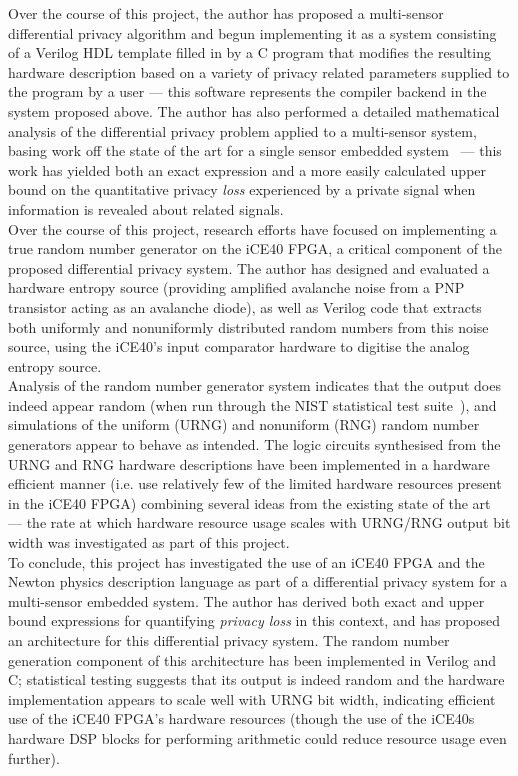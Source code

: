 \documentclass[12pt]{article}
\begin{document}
Over the course of this project, the author has proposed a multi-sensor differential privacy algorithm and begun implementing it as a system consisting of a Verilog HDL template filled in by a C program that modifies the resulting hardware description based on a variety of privacy related parameters supplied to the program by a user --- this software represents the compiler backend in the system proposed above. The author has also performed a detailed mathematical analysis of the differential privacy problem applied to a multi-sensor system, basing work off the state of the art for a single sensor embedded system~\cite{Choi2018GuaranteeingLD} --- this work has yielded both an exact expression and a more easily calculated upper bound on the quantitative privacy \textit{loss} experienced by a private signal when information is revealed about related signals.\\

Over the course of this project, research efforts have focused on implementing a true random number generator on the iCE40 FPGA, a critical component of the proposed differential privacy system. The author has designed and evaluated a hardware entropy source (providing amplified avalanche noise from a PNP transistor acting as an avalanche diode), as well as Verilog code that extracts both uniformly and nonuniformly distributed random numbers from this noise source, using the iCE40's input comparator hardware to digitise the analog entropy source.\\

Analysis of the random number generator system indicates that the output does indeed appear random (when run through the NIST statistical test suite\cite{nist_test_suite}~\cite{arcetri_sts}), and simulations of the uniform (URNG) and nonuniform (RNG) random number generators appear to behave as intended. The logic circuits synthesised from the URNG and RNG hardware descriptions have been implemented in a hardware efficient manner (i.e. use relatively few of the limited hardware resources present in the iCE40 FPGA) combining several ideas from the existing state of the art~\cite{DeSchryver}~\cite{clz} --- the rate at which hardware resource usage scales with URNG/RNG output bit width was investigated as part of this project.\\

To conclude, this project has investigated the use of an iCE40 FPGA and the Newton physics description language as part of a differential privacy system for a multi-sensor embedded system. The author has derived both exact and upper bound expressions for quantifying \textit{privacy loss} in this context, and has proposed an architecture for this differential privacy system. The random number generation component of this architecture has been implemented in Verilog and C; statistical testing suggests that its output is indeed random and the hardware implementation appears to scale well with URNG bit width, indicating efficient use of the iCE40 FPGA's hardware resources (though the use of the iCE40s hardware DSP blocks for performing arithmetic could reduce resource usage even further).
\end{document}
